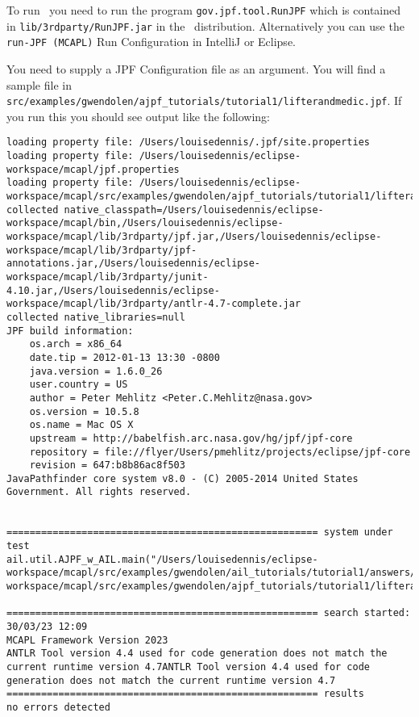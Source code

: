 To run \ajpf\ you need to run the program \texttt{gov.jpf.tool.RunJPF} which is contained in \texttt{lib/3rdparty/RunJPF.jar} in the \mcapl\ distribution.  Alternatively you can use the \texttt{run-JPF (MCAPL)} Run Configuration in IntelliJ or Eclipse.

You need to supply a JPF Configuration file as an argument.  You will find a sample file in \texttt{src/examples/gwendolen/ajpf\_tutorials/tutorial1/lifterandmedic.jpf}.  If you run this you should see output like the following:

\begin{verbatim}
loading property file: /Users/louisedennis/.jpf/site.properties
loading property file: /Users/louisedennis/eclipse-workspace/mcapl/jpf.properties
loading property file: /Users/louisedennis/eclipse-workspace/mcapl/src/examples/gwendolen/ajpf_tutorials/tutorial1/lifterandmedic.jpf
collected native_classpath=/Users/louisedennis/eclipse-workspace/mcapl/bin,/Users/louisedennis/eclipse-workspace/mcapl/lib/3rdparty/jpf.jar,/Users/louisedennis/eclipse-workspace/mcapl/lib/3rdparty/jpf-annotations.jar,/Users/louisedennis/eclipse-workspace/mcapl/lib/3rdparty/junit-4.10.jar,/Users/louisedennis/eclipse-workspace/mcapl/lib/3rdparty/antlr-4.7-complete.jar
collected native_libraries=null
JPF build information:
	os.arch = x86_64
	date.tip = 2012-01-13 13:30 -0800
	java.version = 1.6.0_26
	user.country = US
	author = Peter Mehlitz <Peter.C.Mehlitz@nasa.gov>
	os.version = 10.5.8
	os.name = Mac OS X
	upstream = http://babelfish.arc.nasa.gov/hg/jpf/jpf-core
	repository = file://flyer/Users/pmehlitz/projects/eclipse/jpf-core
	revision = 647:b8b86ac8f503
JavaPathfinder core system v8.0 - (C) 2005-2014 United States Government. All rights reserved.


====================================================== system under test
ail.util.AJPF_w_AIL.main("/Users/louisedennis/eclipse-workspace/mcapl/src/examples/gwendolen/ail_tutorials/tutorial1/answers/ex2.ail","/Users/louisedennis/eclipse-workspace/mcapl/src/examples/gwendolen/ajpf_tutorials/tutorial1/lifterandmedic.psl","1")

====================================================== search started: 30/03/23 12:09
MCAPL Framework Version 2023
ANTLR Tool version 4.4 used for code generation does not match the current runtime version 4.7ANTLR Tool version 4.4 used for code generation does not match the current runtime version 4.7
====================================================== results
no errors detected


\end{verbatim}

